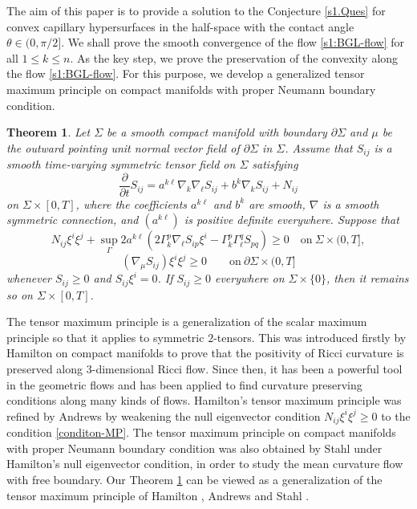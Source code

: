 \documentclass[11pt,reqno]{amsart}
\newtheorem{thm}{Theorem}[section]
\theoremstyle{definition}
\theoremstyle{remark}
\numberwithin{equation}{section}
\renewcommand{\(}{\left(}
\renewcommand{\)}{\right)}
\renewcommand{\-}{\overline}
\begin{document}
The aim of this paper is to provide a solution to the Conjecture \ref{s1.Ques} for convex capillary hypersurfaces in the half-space with the contact angle $\theta\in(0,\pi/2]$. We shall prove the smooth convergence of the flow \eqref{s1:BGL-flow} for all $1\leq k \leq n$. As the key step, we prove the preservation of the convexity along the flow \eqref{s1:BGL-flow}. For this purpose, we develop a generalized tensor maximum principle on compact manifolds with proper Neumann boundary condition.
\begin{thm}\label{s1:thm-max principle}
	Let $\Sigma$ be a smooth compact manifold with boundary $\partial \Sigma$ and $\mu$ be the outward pointing unit normal vector field of $\partial\Sigma$ in $\Sigma$. Assume that $S_{ij}$ is a smooth time-varying symmetric tensor field on $\Sigma$ satisfying
	\begin{equation*}
	\frac{\partial}{\partial t}S_{ij}=a^{k\ell}\nabla_k\nabla_\ell S_{ij}+b^k\nabla_kS_{ij}+N_{ij}
	\end{equation*}
	on $\Sigma\times [0,T]$, where the coefficients $a^{k\ell}$ and $b^k$ are smooth, $\nabla$ is a smooth symmetric connection, and $(a^{k\ell})$ is positive definite everywhere. Suppose that
	\begin{equation}\label{conditon-MP}
	N_{ij}\xi^i\xi^j+\sup_{\Gamma}2a^{k\ell}\left(2\Gamma^p_k\nabla_\ell S_{ip}\xi^i-\Gamma_k^p\Gamma_\ell^qS_{pq}\right)\geq 0\quad \mathrm{on}~\Sigma\times (0,T],
	\end{equation}
	\begin{equation}\label{eq-bou}
	\left(\nabla_\mu S_{ij}\right)\xi^i\xi^j\geq 0\qquad \mathrm{on}~ \partial\Sigma\times (0,T]
	\end{equation}
	whenever $S_{ij}\geq 0$ and $S_{ij}\xi^i=0$. If $S_{ij}\geq 0$ everywhere on $\Sigma\times\{0\}$, then it remains so on $\Sigma\times[0,T]$.
\end{thm}
The tensor maximum principle is a generalization of the scalar maximum principle so that it applies to symmetric $2$-tensors. This was introduced firstly by Hamilton \cite[Theorem 9.1]{Hamilton1982} on compact manifolds to prove that the positivity of Ricci curvature is preserved along $3$-dimensional Ricci flow. Since then, it has been a powerful tool in the geometric flows and has been applied to find curvature preserving conditions along many kinds of flows. Hamilton's tensor maximum principle was refined by Andrews \cite[Theorem 3.1]{And2007} by weakening the null eigenvector condition $N_{ij}\xi^i\xi^j\geq 0$ to the condition \eqref{conditon-MP}. The tensor maximum principle on compact manifolds with proper Neumann boundary condition was also obtained by Stahl \cite[Theorem 3.3]{Stahl1996-2} under Hamilton's null eigenvector condition, in order to study the mean curvature flow with free boundary. Our Theorem \ref{s1:thm-max principle} can be viewed as a generalization of the tensor maximum principle of Hamilton \cite[Theorem 9.1]{Hamilton1982}, Andrews \cite[Theorem 3.1]{And2007} and Stahl \cite[Theorem 3.3]{Stahl1996-2}.
\end{document}

